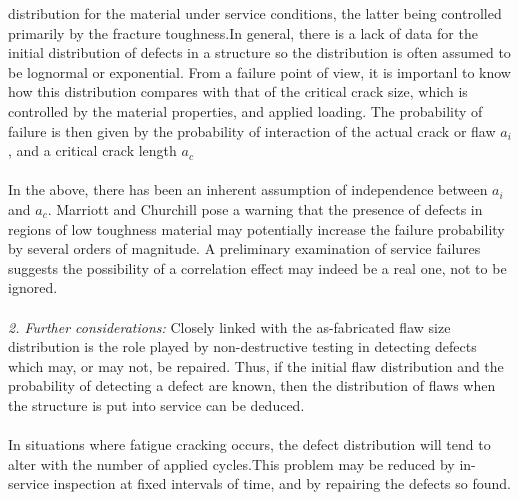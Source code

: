 \documentclass[12pt]{article}
\begin{document}
distribution for the material under service conditions, the latter being controlled
primarily by the fracture toughness.In general, there is a lack of data for
the initial distribution of defects in a structure so the distribution is often assumed to
be lognormal or exponential. From a failure point of view, it is importanl to know
how this distribution compares with that of the critical crack size, which is
controlled by the material properties, and applied loading. The probability of
failure is then given by the probability of interaction of the actual crack or flaw $a_i$,
and a critical crack length $a_{c}$\\\\
In the above, there has been an inherent assumption of independence between $a_i$
and $a_c$. Marriott and Churchill pose a warning that the presence of defects in
regions of low toughness material may potentially increase the failure probability by
several orders of magnitude. A preliminary examination of service failures suggests
the possibility of a correlation effect may indeed be a real one, not to be ignored.\\\\
{\it 2. Further considerations: }Closely linked with the as-fabricated flaw size distribution is the role played by
non-destructive testing in detecting defects which may, or may not, be repaired.
Thus, if the initial flaw distribution and the probability of detecting a defect are
known, then the distribution of flaws when the structure is put into service can be
deduced.\\\\        
In situations where fatigue cracking occurs, the defect distribution will tend to
alter with the number of applied cycles.This
problem may be reduced by in-service inspection at fixed intervals of time, and by
repairing the defects so found.
\end{document}
